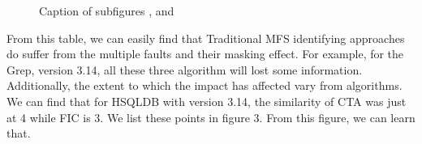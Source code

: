 \documentclass{sig-alternate}
\begin{document}
\begin{figure}[ht]
\centering
{}
\caption[Optional caption for list of figures]{Caption of subfigures ,  and }
\label{fig:subfigureExample}
\end{figure}

From this table, we can easily find that Traditional MFS identifying approaches do suffer from the multiple faults and their masking effect. For example, for the Grep, version 3.14, all these three algorithm will lost some information. Additionally, the extent to which the impact has affected vary from algorithms. We can find that for HSQLDB with version 3.14, the similarity of CTA was just at 4 while FIC is 3. We list these points in figure 3. From this figure, we can learn that.
\end{document}
